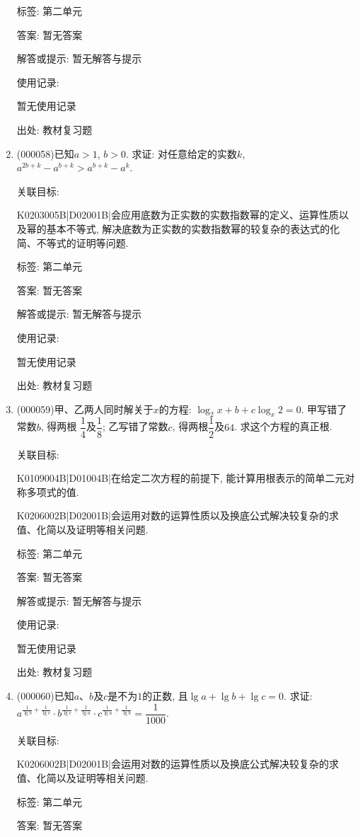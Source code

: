\documentclass[10pt,a4paper]{article}
\begin{document}
\begin{enumerate}[1.]
标签: 第二单元

答案: 暂无答案

解答或提示: 暂无解答与提示

使用记录:

暂无使用记录


出处: 教材复习题
\item { (000058)}已知$a>1$, $b>0$. 求证: 对任意给定的实数$k$, $a^{2b+k}-a^{b+k}>a^{b+k}-a^k$.


关联目标:

K0203005B|D02001B|会应用底数为正实数的实数指数幂的定义、运算性质以及幂的基本不等式, 解决底数为正实数的实数指数幂的较复杂的表达式的化简、不等式的证明等问题.



标签: 第二单元

答案: 暂无答案

解答或提示: 暂无解答与提示

使用记录:

暂无使用记录


出处: 教材复习题
\item { (000059)}甲、乙两人同时解关于$x$的方程: $\log_2x+b+c\log_x2=0$. 甲写错了常数$b$, 得两根
$\dfrac 14$及$\dfrac 18$; 乙写错了常数$c$, 得两根$\dfrac 12$及$64$. 求这个方程的真正根.


关联目标:

K0109004B|D01004B|在给定二次方程的前提下, 能计算用根表示的简单二元对称多项式的值.

K0206002B|D02001B|会运用对数的运算性质以及换底公式解决较复杂的求值、化简以及证明等相关问题.



标签: 第二单元

答案: 暂无答案

解答或提示: 暂无解答与提示

使用记录:

暂无使用记录


出处: 教材复习题
\item { (000060)}已知$a$、$b$及$c$是不为$1$的正数, 且$\lg a+\lg b+\lg c=0$. 求证: $a^{\frac{1}{\lg b}+\frac{1}{\lg c}}\cdot b^{\frac{1}{\lg c}+\frac{1}{\lg a}}\cdot c^{\frac{1}{\lg a}+\frac{1}{\lg b}}=\dfrac{1}{1000}$.


关联目标:

K0206002B|D02001B|会运用对数的运算性质以及换底公式解决较复杂的求值、化简以及证明等相关问题.



标签: 第二单元

答案: 暂无答案


\end{enumerate}
\end{document}
